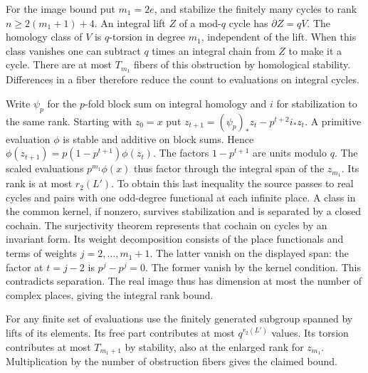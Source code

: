 For the image bound put $m_1=2e$, and stabilize the finitely many
cycles to rank $n\ge2(m_1+1)+4$. An integral lift $Z$ of a
mod-$q$ cycle has $\partial Z=qV$. The homology class of $V$ is
$q$-torsion in degree $m_1$, independent of the lift. When this class
vanishes one can subtract $q$ times an integral chain from $Z$ to
make it a cycle. There are at most $T_{m_1}$ fibers of this obstruction
by homological stability. Differences in a fiber therefore reduce the
count to evaluations on integral cycles.

Write $\psi_p$ for the $p$-fold block sum on integral homology and
$i$ for stabilization to the same rank. Starting with $z_0=x$ put
$z_{t+1}=(\psi_p)_*z_t-p^{t+2}i_*z_t$. A primitive evaluation
$\phi$ is stable and additive on block sums. Hence
$\phi(z_{t+1})=p(1-p^{t+1})\phi(z_t)$. The factors $1-p^{t+1}$
are units modulo $q$. The scaled evaluations $p^{m_1}\phi(x)$ thus
factor through the integral span of the $z_{m_1}$. Its rank is at
most $r_2(L')$. To obtain this last inequality the source passes to
real cycles and pairs with one odd-degree functional at each infinite
place. A class in the common kernel, if nonzero, survives stabilization
and is separated by a closed cochain. The surjectivity theorem represents
that cochain on cycles by an invariant form. Its weight decomposition
consists of the place functionals and terms of weights $j=2,\ldots,m_1+1$.
The latter vanish on the displayed span: the factor at $t=j-2$ is
$p^j-p^j=0$. The former vanish by the kernel condition. This contradicts
separation. The real image thus has dimension at most the number of
complex places, giving the integral rank bound.

For any finite set of evaluations use the finitely generated subgroup
spanned by lifts of its elements. Its free part contributes at most
$q^{r_2(L')}$ values. Its torsion contributes at most $T_{m_1+1}$
by stability, also at the enlarged rank for $z_{m_1}$. Multiplication
by the number of obstruction fibers gives the claimed bound.


